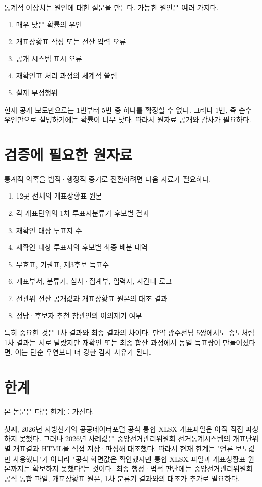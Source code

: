 \documentclass[preprint]{IEIE}
\begin{document}
통계적 이상치는 원인에 대한 질문을 만든다. 가능한 원인은 여러 가지다.

\begin{enumerate}
\item 매우 낮은 확률의 우연
\item 개표상황표 작성 또는 전산 입력 오류
\item 공개 시스템 표시 오류
\item 재확인표 처리 과정의 체계적 쏠림
\item 실제 부정행위
\end{enumerate}

현재 공개 보도만으로는 1번부터 5번 중 하나를 확정할 수 없다. 그러나 1번, 즉 순수 우연만으로 설명하기에는 확률이 너무 낮다. 따라서 원자료 공개와 감사가 필요하다.

\section{검증에 필요한 원자료}

통계적 의혹을 법적·행정적 증거로 전환하려면 다음 자료가 필요하다.

\begin{enumerate}
\item 12곳 전체의 개표상황표 원본
\item 각 개표단위의 1차 투표지분류기 후보별 결과
\item 재확인 대상 투표지 수
\item 재확인 대상 투표지의 후보별 최종 배분 내역
\item 무효표, 기권표, 제3후보 득표수
\item 개표부서, 분류기, 심사·집계부, 입력자, 시간대 로그
\item 선관위 전산 공개값과 개표상황표 원본의 대조 결과
\item 정당·후보자 추천 참관인의 이의제기 여부
\end{enumerate}

특히 중요한 것은 1차 결과와 최종 결과의 차이다. 만약 광주전남 5쌍에서도 송도처럼 1차 결과는 서로 달랐지만 재확인 또는 최종 합산 과정에서 동일 득표쌍이 만들어졌다면, 이는 단순 우연보다 더 강한 감사 사유가 된다.

\section{한계}

본 논문은 다음 한계를 가진다.

첫째, 2026년 지방선거의 공공데이터포털 공식 통합 XLSX 개표파일은 아직 직접 파싱하지 못했다. 그러나 2026년 사례값은 중앙선거관리위원회 선거통계시스템의 개표단위별 개표결과 HTML을 직접 저장·파싱해 대조했다. 따라서 현재 한계는 "언론 보도값만 사용했다"가 아니라 "공식 화면값은 확인했지만 통합 XLSX 파일과 개표상황표 원본까지는 확보하지 못했다"는 것이다. 최종 행정·법적 판단에는 중앙선거관리위원회 공식 통합 파일, 개표상황표 원본, 1차 분류기 결과와의 대조가 추가로 필요하다.
\end{document}
